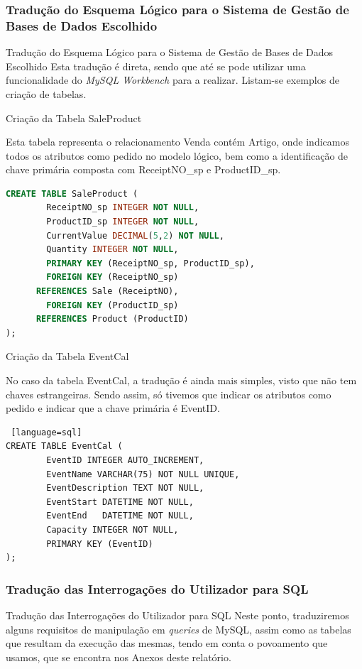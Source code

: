 \documentclass[compress,svgnames,handout,13.7pt]{beamer}
\begin{document}
\subsubsection{Tradução do Esquema Lógico para o Sistema de Gestão de Bases de Dados Escolhido}
\begin{frame}{Tradução do Esquema Lógico para o Sistema de Gestão de Bases de Dados Escolhido}
Esta tradução é direta, sendo que até se pode utilizar uma funcionalidade do \textit{MySQL Workbench} para a realizar.
Listam-se exemplos de criação de tabelas.
\end{frame}
\begin{frame}[fragile]{Criação da Tabela SaleProduct}

        Esta tabela representa o relacionamento Venda contém Artigo, onde indicamos todos os atributos como pedido no modelo lógico, bem como a identificação de chave primária composta com ReceiptNO\_sp e ProductID\_sp.
\begin{lstlisting}[language=sql]
CREATE TABLE SaleProduct (
        ReceiptNO_sp INTEGER NOT NULL,
        ProductID_sp INTEGER NOT NULL,
        CurrentValue DECIMAL(5,2) NOT NULL,
        Quantity INTEGER NOT NULL,
        PRIMARY KEY (ReceiptNO_sp, ProductID_sp),
        FOREIGN KEY (ReceiptNO_sp)
      REFERENCES Sale (ReceiptNO),
        FOREIGN KEY (ProductID_sp)
      REFERENCES Product (ProductID)
);
\end{lstlisting}
        \end{frame}
\begin{frame}[fragile]{Criação da Tabela EventCal}

        No caso da tabela EventCal, a tradução é ainda mais simples, visto que não tem chaves estrangeiras. Sendo assim, 
        só tivemos que indicar os atributos como pedido e indicar que a chave primária é EventID.
\begin{lstlisting} [language=sql]
CREATE TABLE EventCal (
        EventID INTEGER AUTO_INCREMENT,
        EventName VARCHAR(75) NOT NULL UNIQUE,
        EventDescription TEXT NOT NULL,
        EventStart DATETIME NOT NULL,
        EventEnd   DATETIME NOT NULL,
        Capacity INTEGER NOT NULL,
        PRIMARY KEY (EventID)
);
\end{lstlisting}
\end{frame}

\subsubsection{Tradu\c{c}\~{a}o das Interroga\c{c}\~{o}es do Utilizador para SQL}
\begin{frame}{Tradu\c{c}\~{a}o das  Interroga\c{c}\~{o}es do Utilizador para SQL}
Neste ponto, traduziremos alguns requisitos de manipulação em \textit{queries} de MySQL, assim como as tabelas que resultam da execução das mesmas, tendo em conta o povoamento que usamos, que se encontra nos Anexos deste relatório.
\end{frame}
\end{document}
